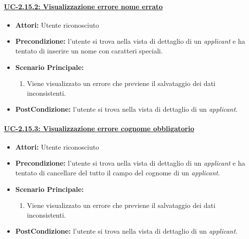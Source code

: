\paragraph{\underline{UC-2.15.2: Visualizzazione errore nome errato}}
\begin{itemize}	
	\item \textbf{Attori:} Utente riconosciuto
	\item \textbf{Precondizione:}  l'utente si trova nella vista di dettaglio di un \textit{applicant} e ha tentato di inserire un nome con caratteri speciali.
	\item \textbf{Scenario Principale:}
	\begin{enumerate}
		\item Viene visualizzato un errore che previene il salvataggio dei dati inconsistenti.
	\end{enumerate}
	\item \textbf{PostCondizione:} l'utente si trova nella vista di dettaglio di un \textit{applicant}.
\end{itemize}

\paragraph{\underline{UC-2.15.3: Visualizzazione errore cognome obbligatorio}}
\begin{itemize}	
	\item \textbf{Attori:} Utente riconosciuto
	\item \textbf{Precondizione:}  l'utente si trova nella vista di dettaglio di un \textit{applicant} e ha tentato di cancellare del tutto il campo del cognome di un \textit{applicant}.
	\item \textbf{Scenario Principale:}
	\begin{enumerate}
		\item Viene visualizzato un errore che previene il salvataggio dei dati inconsistenti.
	\end{enumerate}
	\item \textbf{PostCondizione:} l'utente si trova nella vista di dettaglio di un \textit{applicant}.
\end{itemize}

